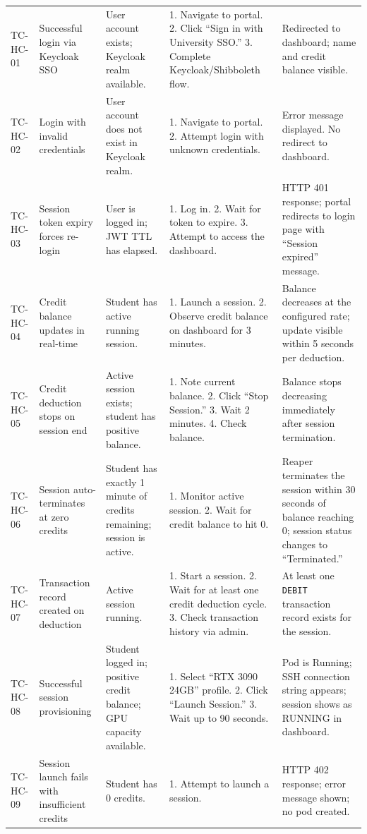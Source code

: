 \documentclass[12pt,a4paper]{article}
\begin{document}
\begin{longtable}{@{}L{2cm}L{3cm}L{3cm}L{3.5cm}L{3cm}@{}}
  TC-HC-01 & Successful login via Keycloak SSO & User account exists; Keycloak realm available. & 1. Navigate to portal. 2. Click ``Sign in with University SSO.'' 3. Complete Keycloak/Shibboleth flow. & Redirected to dashboard; name and credit balance visible. \\
    TC-HC-02 & Login with invalid credentials & User account does not exist in Keycloak realm. & 1. Navigate to portal. 2. Attempt login with unknown credentials. & Error message displayed. No redirect to dashboard. \\
  TC-HC-03 & Session token expiry forces re-login & User is logged in; JWT TTL has elapsed. & 1. Log in. 2. Wait for token to expire. 3. Attempt to access the dashboard. & HTTP 401 response; portal redirects to login page with ``Session expired'' message. \\
    TC-HC-04 & Credit balance updates in real-time & Student has active running session. & 1. Launch a session. 2. Observe credit balance on dashboard for 3 minutes. & Balance decreases at the configured rate; update visible within 5 seconds per deduction. \\
  TC-HC-05 & Credit deduction stops on session end & Active session exists; student has positive balance. & 1. Note current balance. 2. Click ``Stop Session.'' 3. Wait 2 minutes. 4. Check balance. & Balance stops decreasing immediately after session termination. \\
    TC-HC-06 & Session auto-terminates at zero credits & Student has exactly 1 minute of credits remaining; session is active. & 1. Monitor active session. 2. Wait for credit balance to hit 0. & Reaper terminates the session within 30 seconds of balance reaching 0; session status changes to ``Terminated.'' \\
  TC-HC-07 & Transaction record created on deduction & Active session running. & 1. Start a session. 2. Wait for at least one credit deduction cycle. 3. Check transaction history via admin. & At least one \texttt{DEBIT} transaction record exists for the session. \\
    TC-HC-08 & Successful session provisioning & Student logged in; positive credit balance; GPU capacity available. & 1. Select ``RTX 3090 24GB'' profile. 2. Click ``Launch Session.'' 3. Wait up to 90 seconds. & Pod is Running; SSH connection string appears; session shows as RUNNING in dashboard. \\
  TC-HC-09 & Session launch fails with insufficient credits & Student has 0 credits. & 1. Attempt to launch a session. & HTTP 402 response; error message shown; no pod created. \\

\end{longtable}
\end{document}
